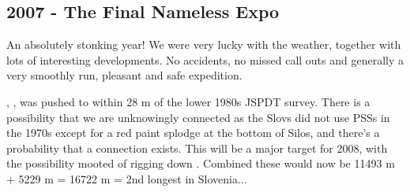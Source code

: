 \begin{tcolorbox}
\chapter{2007 - The Final Nameless Expo}
An absolutely stonking year! We were very lucky with the weather, together with lots of
interesting developments. No accidents, no missed call outs and generally a very smoothly run, pleasant and safe expedition.

, , was pushed to within 28 m of the lower  1980s JSPDT survey. There is a possibility that we are unknowingly connected as the Slovs did not use PSSs in the 1970s except for a red paint splodge at the bottom of Silos, and there's a probability that a connection exists. This will be a major target for 2008, with the possibility mooted of rigging down . Combined these would now be 11493 m + 5229 m = 16722 m = 2nd longest in Slovenia...

\end{tcolorbox}
\BgThispage
